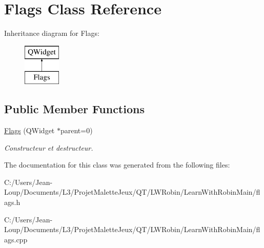 \hypertarget{class_flags}{}\section{Flags Class Reference}
\label{class_flags}
Inheritance diagram for Flags\+:\begin{figure}[H]
\begin{center}
\leavevmode
\includegraphics[height=2.000000cm]{class_flags}
\end{center}
\end{figure}
\subsection*{Public Member Functions}
\begin{DoxyCompactItemize}
\item 
\mbox{\label{class_flags_a2efef25087c4092c8a79c64103a0093e}} 
\hyperlink{class_flags_a2efef25087c4092c8a79c64103a0093e}{Flags} (Q\+Widget $\ast$parent=0)
\begin{DoxyCompactList}\small\item\em Constructeur et destructeur. \end{DoxyCompactList}\end{DoxyCompactItemize}


The documentation for this class was generated from the following files\+:\begin{DoxyCompactItemize}
\item 
C\+:/\+Users/\+Jean-\/\+Loup/\+Documents/\+L3/\+Projet\+Malette\+Jeux/\+Q\+T/\+L\+W\+Robin/\+Learn\+With\+Robin\+Main/flags.\+h\item 
C\+:/\+Users/\+Jean-\/\+Loup/\+Documents/\+L3/\+Projet\+Malette\+Jeux/\+Q\+T/\+L\+W\+Robin/\+Learn\+With\+Robin\+Main/flags.\+cpp\end{DoxyCompactItemize}
